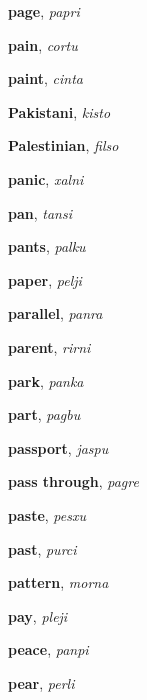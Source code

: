 \documentclass[12pt]{book}
\begin{document}
\begin{description}

\item[ ] \textbf{page}, \textit{papri}

\item[ ] \textbf{pain}, \textit{cortu}

\item[ ] \textbf{paint}, \textit{cinta}

\item[ ] \textbf{Pakistani}, \textit{kisto}

\item[ ] \textbf{Palestinian}, \textit{filso}

\item[ ] \textbf{panic}, \textit{xalni}

\item[ ] \textbf{pan}, \textit{tansi}

\item[ ] \textbf{pants}, \textit{palku}

\item[ ] \textbf{paper}, \textit{pelji}

\item[ ] \textbf{parallel}, \textit{panra}

\item[ ] \textbf{parent}, \textit{rirni}

\item[ ] \textbf{park}, \textit{panka}

\item[ ] \textbf{part}, \textit{pagbu}

\item[ ] \textbf{passport}, \textit{jaspu}

\item[ ] \textbf{pass through}, \textit{pagre}

\item[ ] \textbf{paste}, \textit{pesxu}

\item[ ] \textbf{past}, \textit{purci}

\item[ ] \textbf{pattern}, \textit{morna}

\item[ ] \textbf{pay}, \textit{pleji}

\item[ ] \textbf{peace}, \textit{panpi}

\item[ ] \textbf{pear}, \textit{perli}


\end{description}
\end{document}
